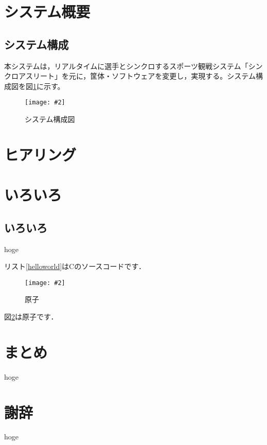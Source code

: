 \documentclass[10pt,a4paper]{jsarticle}
\newcommand{\figuref}[1]{図\ref{#1}}
\newcommand{\fig}[4][width=\textwidth]{
    \begin{figure}[!h]
    \begin{center}
    \texttt{[image: \#2]}
    \caption{#3}
    \label{#4}
    \end{center}
    \end{figure}
}
\newcommand{\lstref}[1]{リスト\ref{#1}}
\begin{document}
\clearpage

\section{システム概要}
\subsection{システム構成}
本システムは，リアルタイムに選手とシンクロするスポーツ観戦システム「シンクロアスリート」\cite{synchro}を元に，筐体・ソフトウェアを変更し，実現する。システム構成図を\figuref{sys_config}に示す。

\fig{image/sys_config.png}{システム構成図}{sys_config}

\clearpage

\section{ヒアリング}

\clearpage

\section{いろいろ}
\subsection{いろいろ}
hoge

\lstref{helloworld}はCのソースコードです．

\fig{image/atom.jpg}{原子}{atom}

\figuref{atom}は原子です\cite{irasutoya}．

\clearpage

\section{まとめ}
hoge

\clearpage

\section*{謝辞} %
hoge

\clearpage
\end{document}
